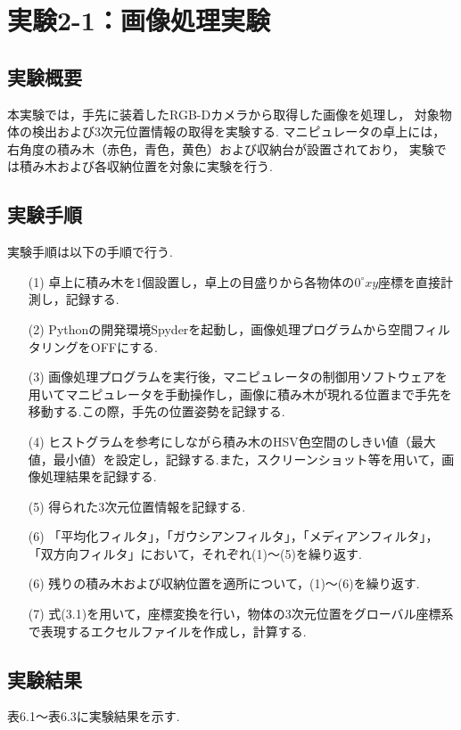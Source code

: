 
\section{実験2-1：画像処理実験}

\subsection{実験概要}
本実験では，手先に装着したRGB-Dカメラから取得した画像を処理し，
対象物体の検出および3次元位置情報の取得を実験する.
マニピュレータの卓上には，右角度の積み木（赤色，青色，黄色）および収納台が設置されており，
実験では積み木および各収納位置を対象に実験を行う.

\subsection{実験手順}
実験手順は以下の手順で行う.

\begin{enumerate}
  \item[(1)] 卓上に積み木を1個設置し，卓上の目盛りから各物体の$0^{\circ}xy$座標を直接計測し，記録する.
  \item[(2)] Pythonの開発環境Spyderを起動し，画像処理プログラムから空間フィルタリングをOFFにする.
  \item[(3)] 画像処理プログラムを実行後，マニピュレータの制御用ソフトウェアを用いてマニピュレータを手動操作し，画像に積み木が現れる位置まで手先を移動する.この際，手先の位置姿勢を記録する.
  \item[(4)] ヒストグラムを参考にしながら積み木のHSV色空間のしきい値（最大値，最小値）を設定し，記録する.また，スクリーンショット等を用いて，画像処理結果を記録する.
  \item[(5)] 得られた3次元位置情報を記録する.
  \item[(6)] 「平均化フィルタ」，「ガウシアンフィルタ」，「メディアンフィルタ」，「双方向フィルタ」において，それぞれ(1)～(5)を繰り返す.
  \item[(6)] 残りの積み木および収納位置を適所について，(1)～(6)を繰り返す.
  \item[(7)] 式(3.1)を用いて，座標変換を行い，物体の3次元位置をグローバル座標系で表現するエクセルファイルを作成し，計算する.
\end{enumerate}

\subsection{実験結果}
表6.1～表6.3に実験結果を示す.

